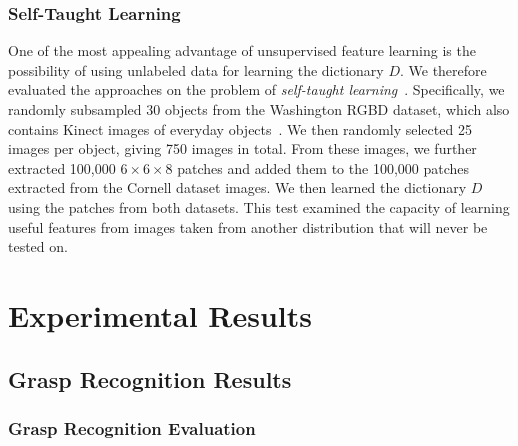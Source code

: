 \documentclass[svgnames]{scrartcl}
\begin{document}
\subsubsection{Self-Taught Learning}

One of the most appealing advantage of unsupervised feature learning is the possibility of using unlabeled data for learning the dictionary $D$. We therefore evaluated the approaches on the problem of \textit{self-taught learning}~\citep{raina2007self}. Specifically, we randomly subsampled 30 objects from the Washington RGBD dataset, which also contains Kinect images of everyday objects~\citep{lai2011large}. We then randomly selected 25 images per object, giving 750 images in total. From these images, we further extracted 100,000 $6 \times 6 \times 8$ patches and added them to the 100,000 patches extracted from the Cornell dataset images. We then learned the dictionary $D$ using the patches from both datasets. This test examined the capacity of learning useful features from images taken from another distribution that will never be tested on.

\section{Experimental Results}
\label{sec:experimental_results}

\subsection{Grasp Recognition Results}

\subsubsection{Grasp Recognition Evaluation}
\end{document}
